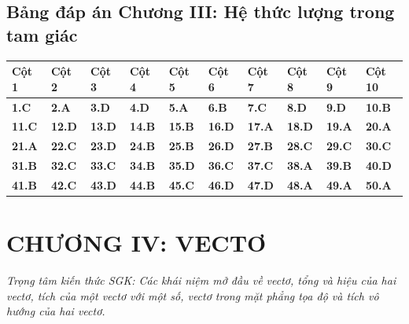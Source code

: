 \documentclass[11pt,a4paper]{article}
\begin{document}
\subsection*{\color{primary} Bảng đáp án Chương III: Hệ thức lượng trong tam giác}
\begin{center}
\renewcommand{\arraystretch}{1.25}
\begin{tabularx}{\textwidth}{*{10}{>{\centering\arraybackslash}X}}
\toprule
\textbf{\color{primary} Cột 1} & \textbf{\color{primary} Cột 2} & \textbf{\color{primary} Cột 3} & \textbf{\color{primary} Cột 4} & \textbf{\color{primary} Cột 5} & \textbf{\color{primary} Cột 6} & \textbf{\color{primary} Cột 7} & \textbf{\color{primary} Cột 8} & \textbf{\color{primary} Cột 9} & \textbf{\color{primary} Cột 10} \\
\midrule
\textbf{1.C} & \textbf{2.A} & \textbf{3.D} & \textbf{4.D} & \textbf{5.A} & \textbf{6.B} & \textbf{7.C} & \textbf{8.D} & \textbf{9.D} & \textbf{10.B} \\
\rowcolor{rowtint} \textbf{11.C} & \textbf{12.D} & \textbf{13.D} & \textbf{14.B} & \textbf{15.B} & \textbf{16.D} & \textbf{17.A} & \textbf{18.D} & \textbf{19.A} & \textbf{20.A} \\
\textbf{21.A} & \textbf{22.C} & \textbf{23.D} & \textbf{24.B} & \textbf{25.B} & \textbf{26.D} & \textbf{27.B} & \textbf{28.C} & \textbf{29.C} & \textbf{30.C} \\
\rowcolor{rowtint} \textbf{31.B} & \textbf{32.C} & \textbf{33.C} & \textbf{34.B} & \textbf{35.D} & \textbf{36.C} & \textbf{37.C} & \textbf{38.A} & \textbf{39.B} & \textbf{40.D} \\
\textbf{41.B} & \textbf{42.C} & \textbf{43.D} & \textbf{44.B} & \textbf{45.C} & \textbf{46.D} & \textbf{47.D} & \textbf{48.A} & \textbf{49.A} & \textbf{50.A} \\
\bottomrule
\end{tabularx}
\end{center}\vspace{10pt}
\section*{\color{primary} CHƯƠNG IV: VECTƠ}
\textit{Trọng tâm kiến thức SGK: Các khái niệm mở đầu về vectơ, tổng và hiệu của hai vectơ, tích của một vectơ với một số, vectơ trong mặt phẳng tọa độ và tích vô hướng của hai vectơ.}\par\vspace{4pt}
\end{document}
